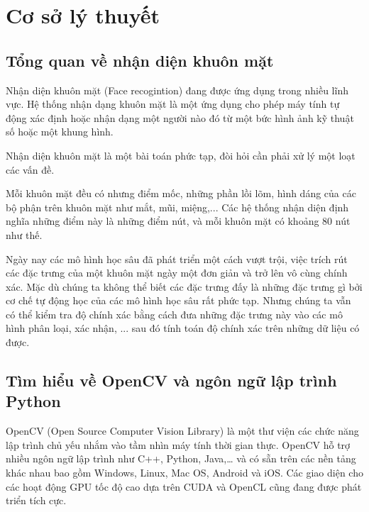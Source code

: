 \chapter{Cơ sở lý thuyết}
\label{cha: chap2}

\section{Tổng quan về nhận diện khuôn mặt}

Nhận diện khuôn mặt (Face recogintion) đang được ứng dụng trong nhiều lĩnh vực.
Hệ thống nhận dạng khuôn mặt là một ứng dụng cho phép máy tính tự động xác định
hoặc nhận dạng một người nào đó từ một bức hình ảnh kỹ thuật số hoặc một khung
hình.

Nhận diện khuôn mặt là một bài toán phức tạp, đòi hỏi cần phải xử lý một
loạt các vấn đề.

Mỗi khuôn mặt đều có nhưng điểm mốc, những phần lồi lõm, hình dáng của các
bộ phận trên khuôn mặt như mắt, mũi, miệng,... Các hệ thống nhận diện định
nghĩa những điểm này là những điểm nút, và mỗi khuôn mặt có khoảng 80 nút như thế.

Ngày nay các mô hình học sâu đã phát triển một cách vượt trội, việc trích rút các đặc trưng của một
khuôn mặt ngày một đơn giản và trở lên vô cùng chính xác. Mặc dù chúng ta không thể biết các đặc trưng đấy
là những đặc trưng gì bởi cơ chế tự động học của các mô hình học sâu rất phức tạp. Nhưng chúng ta vẫn có thể
kiểm tra độ chính xác bằng cách đưa những đặc trưng này vào các mô hình phân loại, xác nhận, ... sau đó
tính toán độ chính xác trên những dữ liệu có được.


\section{Tìm hiểu về OpenCV và ngôn ngữ lập trình Python}

OpenCV (Open Source Computer Vision Library) là một thư viện các chức năng lập
trình chủ yếu nhắm vào tầm nhìn máy tính thời gian thực. OpenCV hỗ trợ nhiều ngôn
ngữ lập trình như C++, Python, Java,… và có sẵn trên các nền tảng khác nhau bao
gồm Windows, Linux, Mac OS, Android và iOS. Các giao diện cho các hoạt động
GPU tốc độ cao dựa trên CUDA và OpenCL cũng đang được phát triển tích cực.

